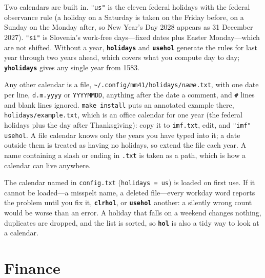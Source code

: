 \documentclass[11pt,letterpaper]{article}
\newcommand{\code}[1]{\texttt{#1}}
\newcommand{\cmd}[1]{\texttt{\textbf{#1}}}
\begin{document}
Two calendars are built in. \code{"us"} is the eleven federal holidays with the federal observance rule (a holiday on a Saturday is taken on the Friday before, on a Sunday on the Monday after, so New Year's Day 2028 appears as 31 December 2027). \code{"si"} is Slovenia's work-free days---fixed dates plus Easter Monday---which are not shifted. Without a year, \cmd{holidays} and \cmd{usehol} generate the rules for last year through two years ahead, which covers what you compute day to day; \cmd{yholidays} gives any single year from 1583.

Any other calendar is a file, \code{\textasciitilde/.config/mm41/holidays/\emph{name}.txt}, with one date per line, \code{d.m.yyyy} or \code{YYYYMMDD}, anything after the date a comment, and \code{\#} lines and blank lines ignored. \code{make install} puts an annotated example there, \code{holidays/example.txt}, which is an office calendar for one year (the federal holidays plus the day after Thanksgiving): copy it to \code{imf.txt}, edit, and \code{"imf" usehol}. A file calendar knows only the years you have typed into it; a date outside them is treated as having no holidays, so extend the file each year. A name containing a slash or ending in \code{.txt} is taken as a path, which is how a calendar can live anywhere.

The calendar named in \code{config.txt} (\code{holidays = us}) is loaded on first use. If it cannot be loaded---a misspelt name, a deleted file---every workday word reports the problem until you fix it, \cmd{clrhol}, or \cmd{usehol} another: a silently wrong count would be worse than an error. A holiday that falls on a weekend changes nothing, duplicates are dropped, and the list is sorted, so \cmd{hol} is also a tidy way to look at a calendar.

\section{Finance}
\label{sec:finance}
\end{document}
